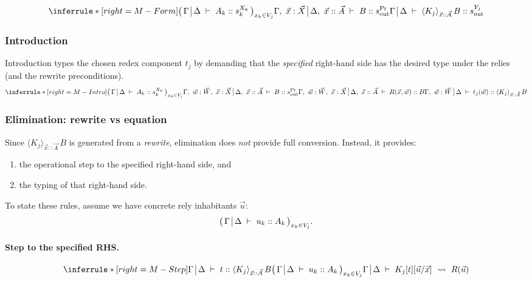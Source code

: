 \documentclass[11pt]{article}
\makeatletter
\theoremstyle{definition}
\theoremstyle{plain}
\theoremstyle{remark}
\theoremstyle{plain}
\newcommand{\judg}[3]{%
  \begingroup
    \setlength{\arraycolsep}{0.3ex}%
    \ensuremath{%
      \begin{array}[t]{@{}l@{\;}|@{\;}l@{}}%
        #1 & #2%
      \end{array}%
      \;\vdash\; #3%
    }%
  \endgroup
}
\newcommand{\angles}[3]{\langle #1 \rangle_{#2}\,#3}
\renewcommand{\Pr}{{\rm Pr}}
\newcommand{\rsq}{\rightsquigarrow}
\makeatother
\begin{document}
\[
\inferrule*[right={M-Form}]
  {
    \bigl(\,\judg{\Gamma}{\Delta}{A_k :: s_k^{X_k}}\,\bigr)_{x_k\in V_j}
    \\
    \judg{\Gamma,\ \vec{x}:\vec{X}}{\Delta,\ \vec{x}::\vec{A}}{B :: s_{\rm out}^{\Pr}}
  }
  { \judg{\Gamma}{\Delta}{\angles{K_j}{\vec{x}::\vec{A}}{B} :: s_{\rm out}^{Y_j}} }
\]

\subsubsection{Introduction}
Introduction types the chosen redex component $t_j$ by demanding that the \emph{specified} right-hand side has the desired type under the relies (and the rewrite preconditions).
\[
\inferrule*[right={M-Intro}]
  {
    \bigl(\,\judg{\Gamma}{\Delta}{A_k :: s_k^{X_k}}\,\bigr)_{x_k\in V_j}
    \\
    \judg{\Gamma,\ \vec{w}:\vec{W},\ \vec{x}:\vec{X}}
         {\Delta,\ \vec{x}::\vec{A}}
         {B :: s_{\rm out}^{\Pr}}
    \\
    \judg{\Gamma,\ \vec{w}:\vec{W},\ \vec{x}:\vec{X}}
         {\Delta,\ \vec{x}::\vec{A}}
         {R(\vec{x},\vec{w}) :: B}
  }
  { \judg{\Gamma,\ \vec{w}:\vec{W}}{\Delta}{t_j(\vec{w}) :: \angles{K_j}{\vec{x}::\vec{A}}{B}} }
\]

\subsubsection{Elimination: rewrite vs equation}
Since $\angles{K_j}{\vec{x}::\vec{A}}{B}$ is generated from a \emph{rewrite}, elimination does \emph{not} provide full conversion. Instead, it provides:
\begin{enumerate}[leftmargin=2em]
  \item the operational step to the specified right-hand side, and
  \item the typing of that right-hand side.
\end{enumerate}

To state these rules, assume we have concrete rely inhabitants $\vec u$:
\[
  \bigl(\,\judg{\Gamma}{\Delta}{u_k :: A_k}\,\bigr)_{x_k\in V_j}.
\]

\paragraph{Step to the specified RHS.}
\[
\inferrule*[right={M-Step}]
  {
    \judg{\Gamma}{\Delta}{t :: \angles{K_j}{\vec{x}::\vec{A}}{B}}
    \\
    \bigl(\,\judg{\Gamma}{\Delta}{u_k :: A_k}\,\bigr)_{x_k\in V_j}
  }
  { \judg{\Gamma}{\Delta}{K_j[t][\vec u/\vec x]\ \rsq\ R(\vec u)} }
\]
\end{document}

